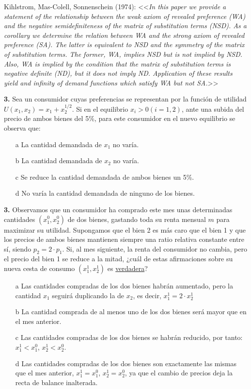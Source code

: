 \documentclass{nuevotema}
\begin{document}
 Kihlstrom, Mas-Colell, Sonnenschein (1974): <<\textit{In this paper we provide a statement of the relationship between the weak axiom of revealed preference (WA) and the negative semidefiniteness of the matrix of substitution terms (NSD). As a corollary we determine the relation between WA and the strong axiom of revealed preference (SA). The latter is equivalent to NSD and the symmetry of the matrix of substitution terms. The former, WA, implies NSD but is not implied by NSD. Also, WA is implied by the condition that the matrix of substitution terms is negative definite (ND), but it does not imply ND. Application of these results yield and infinity of demand functions which satisfy WA but not SA.}>>

\preguntas

\textbf{3.} Sea un consumidor cuyas preferencias se representan por la función de utilidad $U(x_1, x_2) = x_1 + x_2^{1/2}$. Si en el equilibrio $x_i > 0 (i=1,2)$, ante una subida del precio de ambos bienes del 5\%, para este consumidor en el nuevo equilibrio se observa que:

\begin{itemize}
	\item[a] La cantidad demandada de $x_1$ no varía.
	\item[b] La cantidad demandada de $x_2$ no varía.
	\item[c] Se reduce la cantidad demandada de ambos bienes un 5\%.
	\item[d] No varía la cantidad demandada de ninguno de los bienes. 
\end{itemize}

\textbf{3.} Observamos que un consumidor ha comprado este mes unas determinadas cantidades $(x_1^0, x_2^0)$ de dos bienes, gastando toda su renta mensual $m$ para maximizar su utilidad. Supongamos que el bien 2 es más caro que el bien 1 y que los precios de ambos bienes mantienen siempre una ratio relativa constante entre sí, siendo $p_2=2\cdot p_1$. Si, al mes siguiente, la renta del consumidor no cambia, pero el precio del bien 1 se reduce a la mitad, ¿cuál de estas afirmaciones sobre su nueva cesta de consumo $(x_1^1, x_2^1)$ es \underline{verdadera}?

\begin{itemize}
	\item[a] Las cantidades compradas de los dos bienes habrán aumentado, pero la cantidad $x_1$ seguirá duplicando la de $x_2$, es decir, $x^1_1 = 2 \cdot x_2^1$
	\item[b] La cantidad comprada de al menos uno de los dos bienes será mayor que en el mes anterior.
	\item[c] Las cantidades compradas de los dos bienes se habrán reducido, por tanto: $x_1^1 < x_1^0$, $x_2^1 < x_2^0$.
	\item[d] Las cantidades compradas de los dos bienes son exactamente las mismas que el mes anterior, $x_1^1 = x_1^0$, $x_2^1 = x_2^0$, ya que el cambio de precios deja la recta de balance inalterada.
\end{itemize}
\end{document}
